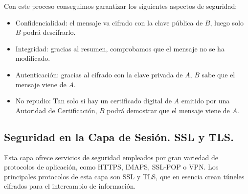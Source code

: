 Con este proceso conseguimos garantizar los siguientes aspectos de seguridad:
\begin{itemize}
    \item Confidencialidad: el mensaje va cifrado con la clave pública de $B$, luego solo $B$ podrá descifrarlo.
    \item Integridad: gracias al resumen, comprobamos que el mensaje no se ha modificado.
    \item Autenticación: gracias al cifrado con la clave privada de $A$, $B$ sabe que el mensaje viene de $A$.
    \item No repudio: Tan solo si hay un certificado digital de $A$ emitido por una Autoridad de Certificación, $B$ podrá demostrar que el mensaje viene de $A$.
\end{itemize}


\subsection{Seguridad en la Capa de Sesión. \acrshort{SSL} y \acrshort{TLS}.}

Esta capa ofrece servicios de seguridad empleados por gran variedad de protocolos de aplicación, como \acrshort{HTTPS}, \acrshort{IMAPS}, \acrshort{SSL}-\acrshort{POP} o \acrshort{VPN}. Los principales protocolos de esta capa son \acrshort{SSL} y \acrshort{TLS}, que en esencia crean túneles cifrados para el intercambio de información.

